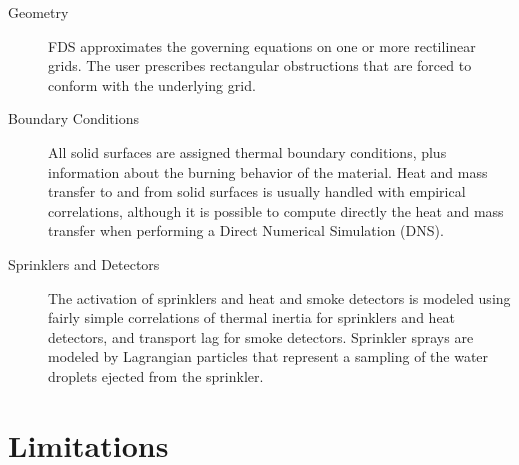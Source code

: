 \documentclass[11pt]{book}
\begin{document}
\begin{description}
\item[Geometry]
FDS approximates the governing equations on one or more rectilinear grids. The user prescribes rectangular obstructions that are forced to conform
with the underlying grid.
\item[Boundary Conditions]
All solid surfaces are assigned thermal boundary conditions, plus information about the burning behavior of the material. Heat and mass transfer to
and from solid surfaces is usually handled with empirical correlations, although it is possible to compute directly the heat and mass transfer when
performing a Direct Numerical Simulation (DNS).
\item[Sprinklers and Detectors] The activation of sprinklers and heat and smoke detectors
is modeled using fairly simple correlations of thermal inertia for sprinklers and heat detectors, and transport lag for smoke detectors. Sprinkler
sprays are modeled by Lagrangian particles that represent a sampling of the water droplets ejected from the sprinkler.
\end{description}


\section{Limitations}
\end{document}
